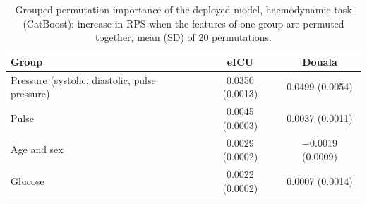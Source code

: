 \begin{table}[htbp]
\centering\footnotesize
\caption{Grouped permutation importance of the deployed model, haemodynamic task (CatBoost): increase in RPS when the features of one group are permuted together, mean (SD) of 20 permutations.}\label{tab:importance-haemodynamic}
\begin{tabular}{@{}lcc@{}}
\toprule
\textbf{Group} & \textbf{eICU} & \textbf{Douala} \\
\midrule
Pressure (systolic, diastolic, pulse pressure) & 0.0350 (0.0013) & 0.0499 (0.0054) \\
Pulse & 0.0045 (0.0003) & 0.0037 (0.0011) \\
Age and sex & 0.0029 (0.0002) & $-$0.0019 (0.0009) \\
Glucose & 0.0022 (0.0002) & 0.0007 (0.0014) \\
\bottomrule
\end{tabular}
\end{table}
